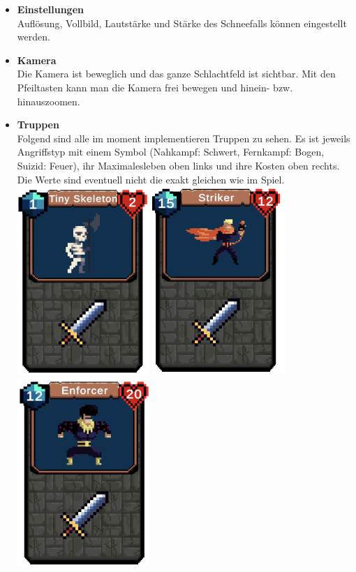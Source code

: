 \begin{itemize}
\begin{itemize}
        \end{itemize}
    \item \textbf{Einstellungen} \\
        Auflösung, Vollbild, Lautstärke und Stärke des Schneefalls können eingestellt werden.
    \item \textbf{Kamera} \\
        Die Kamera ist beweglich und das ganze Schlachtfeld ist sichtbar. Mit den Pfeiltasten kann man die Kamera frei bewegen und hinein- bzw. hinauszoomen.
    \item \textbf{Truppen} \\
        Folgend sind alle im moment implementieren Truppen zu sehen.
        Es ist jeweils Angriffstyp mit einem Symbol (Nahkampf: Schwert, Fernkampf: Bogen, Suizid: Feuer), ihr Maximalesleben oben links und ihre Kosten oben rechts.
        Die Werte sind eventuell nicht die exakt gleichen wie im Spiel. \\
        \includegraphics[width=5cm]{resources/Skeleton.png}
        \includegraphics[width=5cm]{resources/Striker.png}
        \includegraphics[width=5cm]{resources/Enforcer.png}\\

\end{itemize}
